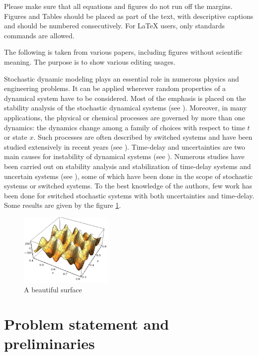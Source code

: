 \documentclass[a4paper,twocolumn,twoside,10pt]{article}
\theoremstyle{definition}
\begin{document}
Please make sure that all equations and figures do not run off the
margins. Figures and Tables should be placed as part of the text, with descriptive captions and should be numbered consecutively. For LaTeX users, only standards commands are allowed.

The following is taken from various papers, including figures without scientific meaning. The purpose is to show various editing usages. 


Stochastic dynamic modeling plays an
essential role in numerous physics and engineering problems. It can
be applied wherever random properties of a dynamical system have to
be considered. Most of the emphasis is placed on the stability
analysis of the stochastic dynamical systems (see
\cite{Arnold}). Moreover, in many applications,
the physical or chemical processes are governed by more than one
dynamics: the dynamics change among a family of choices with respect
to time $t$ or state $x$. Such processes are often described by
switched systems and have been studied extensively in recent years
(see \cite{Cheng, daaf}). Time-delay and uncertainties are two
main causes for instability of dynamical systems (see
\cite{Boyd}). Numerous studies have been carried out on
stability analysis and stabilization of time-delay systems and
uncertain systems (see
\cite{Cao,Chen}), some of which have
been done in the scope of stochastic systems or switched systems. To
the best knowledge of the authors, few work has been done for
switched stochastic systems with both uncertainties and time-delay.
Some results are given by the figure \ref{onesurface}.

\begin{figure}[htp]
\centering
\includegraphics[width=0.4\textwidth]{surface.pdf}
\caption{A beautiful surface}
\label{onesurface}
\end{figure}


\section{Problem statement and preliminaries}\label{sec2}
\end{document}
